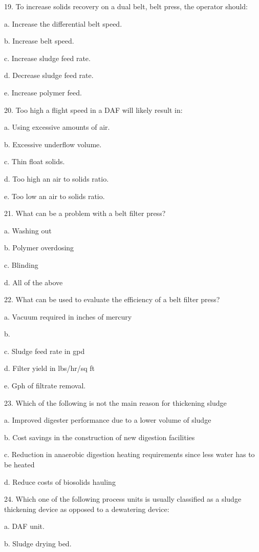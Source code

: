 \documentclass{article}
\begin{document}
19. To increase solids recovery on a dual belt, belt press, the operator should: 

a. Increase the differential belt speed. 

b. Increase belt speed. 

c. Increase sludge feed rate. 

d. Decrease sludge feed rate. 

e. Increase polymer feed. 


20. Too high a flight speed in a DAF will likely result in: 

a. Using excessive amounts of air. 

b. Excessive underflow volume. 

c. Thin float solids. 

d. Too high an air to solids ratio. 

e. Too low an air to solids ratio. 


21. What can be a problem with a belt filter press? 

a. Washing out 

b. Polymer overdosing 

c. Blinding 

d. All of the above 


22. What can be used to evaluate the efficiency of a belt filter press? 

a. Vacuum required in inches of mercury 

b. %

c. Sludge feed rate in gpd 

d. Filter yield in lbs/hr/sq ft 

e. Gph of filtrate removal. 


23. Which of the following is not the main reason for thickening sludge 

a. Improved digester performance due to a lower volume of sludge 

b. Cost savings in the construction of new digestion facilities 

c. Reduction in anaerobic digestion heating requirements since less water has to be heated 

d. Reduce costs of biosolids hauling 


24. Which one of the following process units is usually classified as a sludge thickening device as opposed to a dewatering device: 

a. DAF unit. 

b. Sludge drying bed. 
\end{document}
